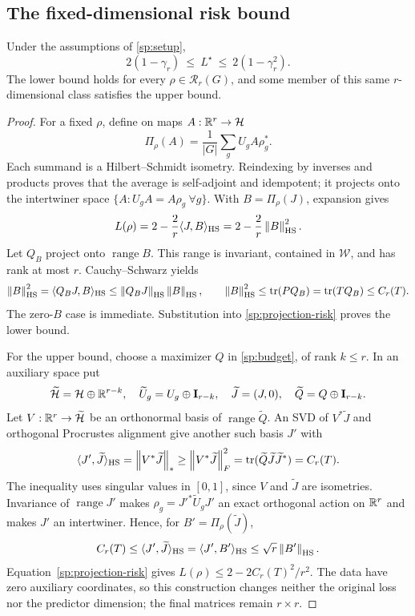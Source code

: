 \subsection{The fixed-dimensional risk bound}
\begin{spectraltheorem}
\label{sp:main}
Under the assumptions of \cref{sp:setup},
\begin{equation}
 \boxed{\quad 2(1-\gamma_r)\ \le\ L^\star\ \le\ 2(1-\gamma_r^2).\quad}
 \label{sp:sandwich}
\end{equation}
The lower bound holds for every $\rho\in\mathcal R_r(G)$, and some member of this same $r$-dimensional class satisfies the upper bound.
\end{spectraltheorem}
\begin{proof}
For a fixed $\rho$, define on maps $A:\mathbb{R}^r\to\mathcal H$
\[
 \Pi_\rho(A)=\frac1{|G|}\sum_gU_gA\rho_g^*.
\]
Each summand is a Hilbert--Schmidt isometry. Reindexing by inverses and products proves that the average is self-adjoint and idempotent; it projects onto the intertwiner space $\{A:U_gA=A\rho_g\ \forall g\}$. With $B=\Pi_\rho(J)$, expansion gives
\begin{equation}
 L(\rho)=2-\frac2r\langle J,B\rangle_{\mathrm{HS}}
        =2-\frac2r\left\lVert B\right\rVert_{\mathrm{HS}}^2.
 \label{sp:projection-risk}
\end{equation}
Let $Q_B$ project onto $\operatorname{range}B$. This range is invariant, contained in $\mathcal W$, and has rank at most $r$. Cauchy--Schwarz yields
\[
 \left\lVert B\right\rVert_{\mathrm{HS}}^2=\langle Q_BJ,B\rangle_{\mathrm{HS}}
 \le\left\lVert Q_BJ\right\rVert_{\mathrm{HS}}\left\lVert B\right\rVert_{\mathrm{HS}},\qquad
 \left\lVert B\right\rVert_{\mathrm{HS}}^2\le\operatorname{tr}(PQ_B)
 =\operatorname{tr}(TQ_B)\le C_r(T).
\]
The zero-$B$ case is immediate. Substitution into \cref{sp:projection-risk} proves the lower bound.

For the upper bound, choose a maximizer $Q$ in \cref{sp:budget}, of rank $k\le r$. In an auxiliary space put
\[
 \widetilde{\mathcal H}=\mathcal H\oplus\mathbb{R}^{r-k},\quad
 \widetilde U_g=U_g\oplus\mathbf{I}_{r-k},\quad
 \widetilde J=(J,0),\quad \widetilde Q=Q\oplus\mathbf{I}_{r-k}.
\]
Let $V:\mathbb{R}^r\to\widetilde{\mathcal H}$ be an orthonormal basis of $\operatorname{range}\widetilde Q$. An SVD of $V^*\widetilde J$ and orthogonal Procrustes alignment give another such basis $J'$ with
\[
 \langle J',\widetilde J\rangle_{\mathrm{HS}}
 =\left\lVert V^*\widetilde J\right\rVert_*
 \ge\left\lVert V^*\widetilde J\right\rVert_F^2
 =\operatorname{tr}(\widetilde Q\widetilde J\widetilde J^*)=C_r(T).
\]
The inequality uses singular values in $[0,1]$, since $V$ and $\widetilde J$ are isometries. Invariance of $\operatorname{range}J'$ makes $\rho_g=J'^*\widetilde U_gJ'$ an exact orthogonal action on $\mathbb{R}^r$ and makes $J'$ an intertwiner. Hence, for $B'=\Pi_\rho(\widetilde J)$,
\[
 C_r(T)\le\langle J',\widetilde J\rangle_{\mathrm{HS}}
 =\langle J',B'\rangle_{\mathrm{HS}}
 \le\sqrt r\left\lVert B'\right\rVert_{\mathrm{HS}}.
\]
Equation~\eqref{sp:projection-risk} gives $L(\rho)\le2-2C_r(T)^2/r^2$. The data have zero auxiliary coordinates, so this construction changes neither the original loss nor the predictor dimension; the final matrices remain $r\times r$.
\end{proof}

